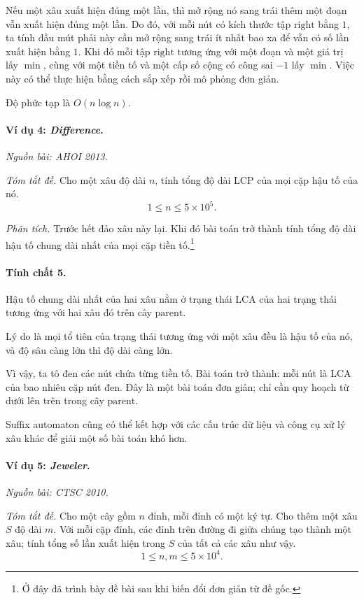 \documentclass[11pt]{article}
\begin{document}
Nếu một xâu xuất hiện đúng một lần, thì mở rộng nó sang trái thêm một đoạn vẫn
xuất hiện đúng một lần. Do đó, với mỗi nút có kích thước tập \(\mathrm{right}\)
bằng \(1\), ta tính đầu mút phải này cần mở rộng sang trái ít nhất bao xa để
vẫn có số lần xuất hiện bằng \(1\). Khi đó mỗi tập \(\mathrm{right}\) tương ứng
với một đoạn và một giá trị lấy \(\min\), cùng với một tiền tố và một cấp số
cộng có công sai \(-1\) lấy \(\min\). Việc này có thể thực hiện bằng cách sắp
xếp rồi mô phỏng đơn giản.

Độ phức tạp là \(O(n\log n)\).

\paragraph{Ví dụ 4: \emph{Difference}.}
\emph{Nguồn bài: AHOI 2013.}

\emph{Tóm tắt đề.}
Cho một xâu độ dài \(n\), tính tổng độ dài LCP của mọi cặp hậu tố của nó.
\[
  1\le n\le 5\times 10^5.
\]

\emph{Phân tích.}
Trước hết đảo xâu này lại. Khi đó bài toán trở thành tính tổng độ dài hậu tố
chung dài nhất của mọi cặp tiền tố.\footnote{Ở đây đã trình bày đề bài sau khi
biến đổi đơn giản từ đề gốc.}

\paragraph{Tính chất 5.}
Hậu tố chung dài nhất của hai xâu nằm ở trạng thái LCA của hai trạng thái tương
ứng với hai xâu đó trên cây \(\mathrm{parent}\).

Lý do là mọi tổ tiên của trạng thái tương ứng với một xâu đều là hậu tố của nó,
và độ sâu càng lớn thì độ dài càng lớn.

Vì vậy, ta tô đen các nút chứa từng tiền tố. Bài toán trở thành: mỗi nút là LCA
của bao nhiêu cặp nút đen. Đây là một bài toán đơn giản; chỉ cần quy hoạch từ
dưới lên trên trong cây \(\mathrm{parent}\).

Suffix automaton cũng có thể kết hợp với các cấu trúc dữ liệu và công cụ xử lý
xâu khác để giải một số bài toán khó hơn.

\paragraph{Ví dụ 5: \emph{Jeweler}.}
\emph{Nguồn bài: CTSC 2010.}

\emph{Tóm tắt đề.}
Cho một cây gồm \(n\) đỉnh, mỗi đỉnh có một ký tự. Cho thêm một xâu \(S\) độ dài
\(m\). Với mỗi cặp đỉnh, các đỉnh trên đường đi giữa chúng tạo thành một xâu;
tính tổng số lần xuất hiện trong \(S\) của tất cả các xâu như vậy.
\[
  1\le n,m\le 5\times 10^4.
\]
\end{document}
